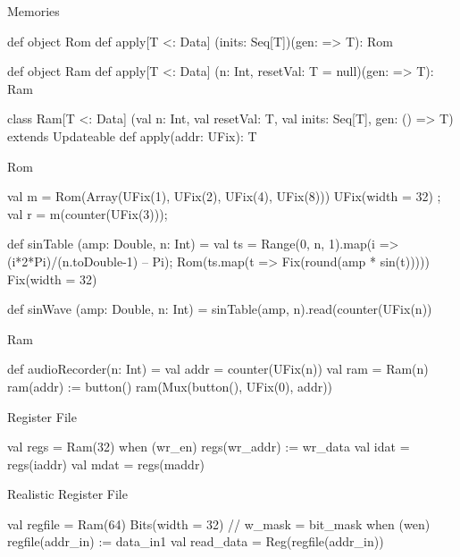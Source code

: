 \documentclass[xcolor=pdflatex,dvipsnames,table]{beamer}
\begin{document}
\begin{frame}[fragile]{Memories}

\begin{scala}
def object Rom {
  def apply[T <: Data]
    (inits: Seq[T])(gen: => T): Rom
}

def object Ram {
  def apply[T <: Data]
    (n: Int, resetVal: T = null)(gen: => T): Ram
}

class Ram[T <: Data]
    (val n: Int, val resetVal: T, val inits: Seq[T],
     gen: () => T) extends Updateable {
  def apply(addr: UFix): T
}
\end{scala}

\end{frame}

\begin{frame}{Rom}

\begin{scala}
val m = Rom(Array(UFix(1), UFix(2), UFix(4), UFix(8))){ UFix(width = 32) };
val r = m(counter(UFix(3)));

def sinTable (amp: Double, n: Int) = {
  val ts = Range(0, n, 1).map(i => (i*2*Pi)/(n.toDouble-1) – Pi); 
  Rom(ts.map(t => Fix(round(amp * sin(t))))){ Fix(width = 32) }
}

def sinWave (amp: Double, n: Int) = 
  sinTable(amp, n).read(counter(UFix(n))
\end{scala}

\end{frame}

\begin{frame}[fragile]{Ram}

\begin{scala}
def audioRecorder(n: Int) = { 
  val addr = counter(UFix(n))
  val ram = Ram(n)
  ram(addr) := button()
  ram(Mux(button(), UFix(0), addr))
} 
\end{scala}

\end{frame}

\begin{frame}[fragile]{Register File}

\begin{scala}
val regs = Ram(32)
when (wr_en) {
 regs(wr_addr) := wr_data
}
val idat = regs(iaddr)
val mdat = regs(maddr)
\end{scala}

\end{frame}

\begin{frame}[fragile]{Realistic Register File}

\begin{scala}
val regfile = Ram(64){ Bits(width = 32) }
// w_mask = bit_mask
when (wen) {
  regfile(addr_in) := data_in1
}
val read_data = Reg(regfile(addr_in))
\end{scala}

\end{frame}
\end{document}

